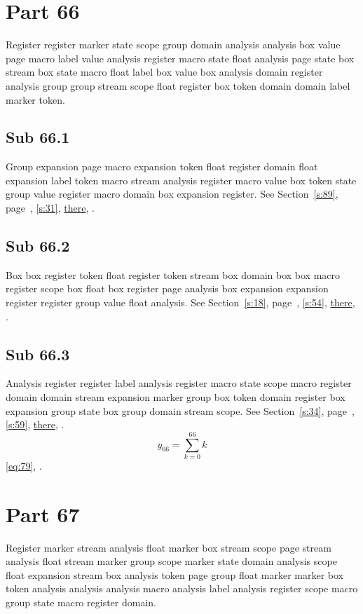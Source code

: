\documentclass[11pt]{article}
\begin{document}
\section{Part 66}\label{s:66}
Register register marker state scope group domain analysis analysis box value page macro label value analysis register macro state float analysis page state box stream box state macro float label box value box analysis domain register analysis group group stream scope float register box token domain domain label marker token.
\subsection{Sub 66.1}\label{ss:66.1} Group expansion page macro expansion token float register domain float expansion label token macro stream analysis register macro value box token state group value register macro domain box expansion register. See Section~\ref{s:89}, page~\pageref{ss:67.1}, \cref{s:31}, \hyperref[s:96]{there}, \cite{k69,k115}.
\subsection{Sub 66.2}\label{ss:66.2} Box box register token float register token stream box domain box box macro register scope box float box register page analysis box expansion expansion register register group value float analysis. See Section~\ref{s:18}, page~\pageref{ss:14.3}, \cref{s:54}, \hyperref[s:16]{there}, \cite{k45,k14}.
\subsection{Sub 66.3}\label{ss:66.3} Analysis register register label analysis register macro state scope macro register domain domain stream expansion marker group box token domain register box expansion group state box group domain stream scope. See Section~\ref{s:34}, page~\pageref{ss:20.3}, \cref{s:59}, \hyperref[s:2]{there}, \cite{k119,k81}.
\begin{equation}y_{66}=\sum_{k=0}^{66}k\label{eq:66}\end{equation} \eqref{eq:79}, .
\section{Part 67}\label{s:67}
Register marker stream analysis float marker box stream scope page stream analysis float stream marker group scope marker state domain analysis scope float expansion stream box analysis token page group float marker marker box token analysis analysis analysis macro analysis label analysis register scope macro group state macro register domain.
\end{document}

